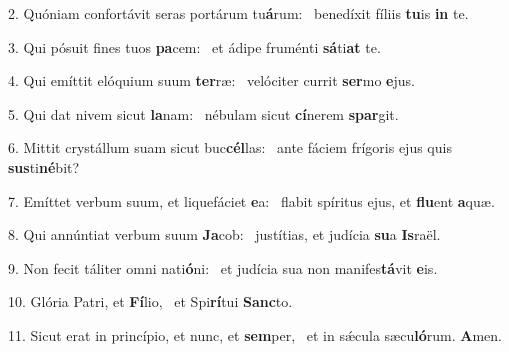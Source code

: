 2. Quóniam confortávit seras portárum tu\textbf{á}rum: \ast\  benedíxit fíliis \textbf{tu}is \textbf{in} te.\

3. Qui pósuit fines tuos \textbf{pa}cem: \ast\  et ádipe fruménti \textbf{sá}ti\textbf{at} te.\

4. Qui emíttit elóquium suum \textbf{ter}ræ: \ast\  velóciter currit \textbf{ser}mo \textbf{e}jus.\

5. Qui dat nivem sicut \textbf{la}nam: \ast\  nébulam sicut \textbf{cí}nerem \textbf{spar}git.\

6. Mittit crystállum suam sicut buc\textbf{cél}las: \ast\  ante fáciem frígoris ejus quis \textbf{sus}ti\textbf{né}bit?\

7. Emíttet verbum suum, et liquefáciet \textbf{e}a: \ast\  flabit spíritus ejus, et \textbf{flu}ent \textbf{a}quæ.\

8. Qui annúntiat verbum suum \textbf{Ja}cob: \ast\  justítias, et judícia \textbf{su}a \textbf{Is}raël.\

9. Non fecit táliter omni nati\textbf{ó}ni: \ast\  et judícia sua non manifes\textbf{tá}vit \textbf{e}is.\

10. Glória Patri, et \textbf{Fí}lio, \ast\  et Spi\textbf{rí}tui \textbf{Sanc}to.\

11. Sicut erat in princípio, et nunc, et \textbf{sem}per, \ast\  et in sǽcula sæcu\textbf{ló}rum. \textbf{A}men.\

